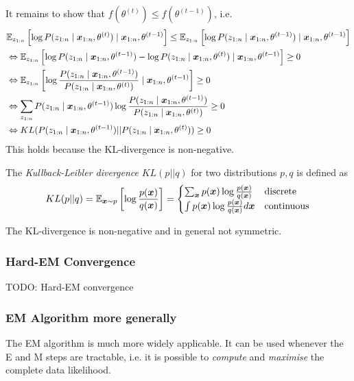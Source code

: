 It remains to show that $f(\theta^{(t)}) \leq f(\theta^{(t-1)})$,
i.e.
\begin{align*}
& \mathbb{E}_{z_{1:n}}\left[
\log{P(z_{1:n} \mid \boldsymbol{x}_{1:n}, \theta^{(t)})}
\mid \boldsymbol{x}_{1:n}, \theta^{(t-1)}
\right]
\leq
\mathbb{E}_{z_{1:n}}\left[
\log{P(z_{1:n} \mid \boldsymbol{x}_{1:n}, \theta^{(t - 1)})}
\mid \boldsymbol{x}_{1:n}, \theta^{(t-1)}
\right] \\
&\Leftrightarrow
\mathbb{E}_{z_{1:n}}\left[
\log{P(z_{1:n} \mid \boldsymbol{x}_{1:n}, \theta^{(t - 1)})}
-
\log{P(z_{1:n} \mid \boldsymbol{x}_{1:n}, \theta^{(t)})}
\mid \boldsymbol{x}_{1:n}, \theta^{(t-1)}
\right]
\geq 0 \\
&\Leftrightarrow
\mathbb{E}_{z_{1:n}}\left[
\log{
	\frac{P(z_{1:n} \mid \boldsymbol{x}_{1:n}, \theta^{(t - 1)})}{P(z_{1:n} \mid \boldsymbol{x}_{1:n}, \theta^{(t)})}
}
\mid \boldsymbol{x}_{1:n}, \theta^{(t-1)}
\right]
\geq 0 \\
&\Leftrightarrow
\sum_{z_{1:n}}{
	P(z_{1:n} \mid \boldsymbol{x}_{1:n}, \theta^{(t-1)})
	\log{
		\frac{P(z_{1:n} \mid \boldsymbol{x}_{1:n}, \theta^{(t - 1)})}{P(z_{1:n} \mid \boldsymbol{x}_{1:n}, \theta^{(t)})}
	}
}
\geq 0 \\
&\Leftrightarrow
KL(P(z_{1:n} \mid \boldsymbol{x}_{1:n}, \theta^{(t - 1)}) || P(z_{1:n} \mid \boldsymbol{x}_{1:n}, \theta^{(t)}))
\geq 0
\end{align*}
This holds because the KL-divergence is non-negative.

The \emph{Kullback-Leibler divergence} $KL(p || q)$
for two distributions $p, q$ is defined as
\begin{equation*}
KL(p || q) = \mathbb{E}_{\boldsymbol{x} \sim p}\left[
\log{\frac{p(\boldsymbol{x})}{q(\boldsymbol{x})}}
\right]
= \begin{cases}
\sum_{\boldsymbol{x}}{p(\boldsymbol{x}) \log{\frac{p(\boldsymbol{x})}{q(\boldsymbol{x})}}}
& \text{discrete} \\
\int{p(\boldsymbol{x}) \log{\frac{p(\boldsymbol{x})}{q(\boldsymbol{x})}} d\boldsymbol{x}}
& \text{continuous}
\end{cases}
\end{equation*}

The KL-divergence is non-negative
and in general not symmetric.

\subsubsection{Hard-EM Convergence}
TODO: Hard-EM convergence

\subsubsection{EM Algorithm more generally}
The EM algorithm is much more widely applicable.
It can be used whenever the E and M steps are
tractable,
i.e. it is possible to
\emph{compute} and \emph{maximise}
the complete data likelihood.

